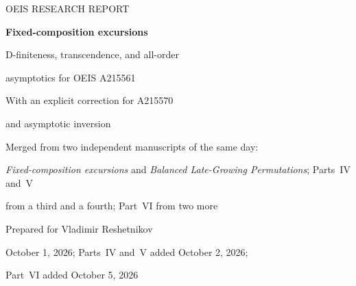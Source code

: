 \documentclass[11pt,a4paper]{article}
\numberwithin{equation}{section}
\theoremstyle{definition}\newtheorem{definition}[theorem]{Definition}
\theoremstyle{remark}\newtheorem{remark}[theorem]{Remark}
\newcommand{\Prob}{\mathbb P}
\begin{document}
\hypersetup{pageanchor=false}
\begin{titlepage}
\centering
\vspace*{0mm}
{\large OEIS RESEARCH REPORT\par}
\vspace{3mm}
{\LARGE\bfseries Fixed-composition excursions\par}
\vspace{3mm}
{\Large D-finiteness, transcendence, and all-order\par asymptotics for OEIS A215561\par}
\vspace{3mm}
{\large With an explicit correction for A215570\par and asymptotic inversion\par}
\vspace{3mm}
{\normalsize Merged from two independent manuscripts of the same day:\par
\emph{Fixed-composition excursions} and
\emph{Balanced Late-Growing Permutations}; Parts~IV and~V\par from a third and a fourth; Part~VI from two more\par}
\vspace{3mm}
{Prepared for Vladimir Reshetnikov\par}
{October 1, 2026; Parts~IV and~V added October 2, 2026;\par Part~VI added October 5, 2026\par}
\vspace{2mm}
\begin{minipage}{0.89\textwidth}
\begin{abstract}
Let $A_r(n)$ count words containing $n$ copies of each letter in
$\{1,\ldots,r\}$ whose every prefix has sum at most its average over all
such words. We prove the fixed-row asymptotic conjecture recorded in
OEIS A215561, identify its constant as a positive algebraic number, and
establish a complete expansion in inverse powers of $n$. The central
formula is
\[
 A_r(n)\sim \frac{\kappa_r}{rn}\frac{(rn)!}{(n!)^r},
 \qquad
 \kappa_r=\exp\!\left(\sum_{m\ge1}\frac{\Prob(S_m=0)}m\right),
\]
where $S_m$ is the centered, uniformly weighted walk associated with the
alphabet. A finite kernel-root product computes $\kappa_r$.

We also prove that every fixed row is D-finite, while its ordinary
generating function is transcendental for every $r\ge3$. This separates
recurrence existence from algebraicity and from the specific recurrence
conjecture for A215570 (proved in Part~IV). An explicit first correction
for that sequence, a fixed-composition contact law, and an all-order
Lambert-$W$ inversion procedure are derived. Exact enumeration and
symbolic checks accompany the proofs.


\end{abstract}
\end{minipage}
\end{titlepage}
\end{document}

